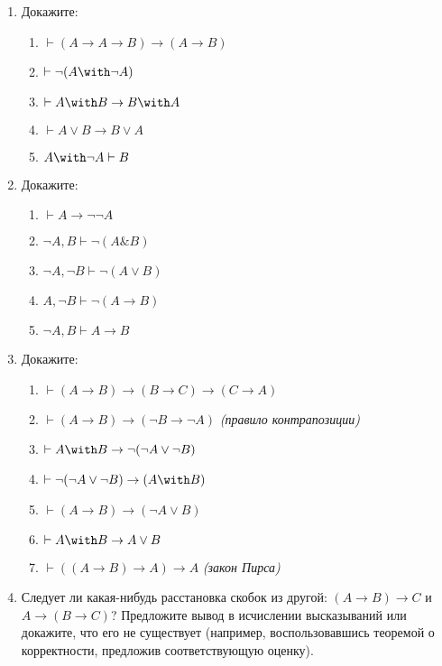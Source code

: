 \documentclass[10pt,a4paper,oneside]{article}
\begin{document}
\begin{enumerate}
\item Докажите:
\begin{enumerate}
\item $\vdash (A \rightarrow A \rightarrow B) \rightarrow (A \rightarrow B)$
\item $\vdash \neg (A \with \neg A)$
\item $\vdash A \with B \rightarrow B \with A$
\item $\vdash A \vee B \rightarrow B \vee A$
\item $A \with \neg A \vdash B$
\end{enumerate}

\item Докажите:
\begin{enumerate}
\item $\vdash A \rightarrow \neg \neg A$
\item $\neg A, B \vdash \neg(A\& B)$
\item $\neg A,\neg B \vdash \neg( A\vee B)$
\item $ A,\neg B \vdash \neg( A\rightarrow B)$
\item $\neg A, B \vdash  A\rightarrow B$
\end{enumerate}

\item Докажите:
\begin{enumerate}
\item $\vdash (A \rightarrow B) \rightarrow (B \rightarrow C) \rightarrow (C \rightarrow A)$ 
\item $\vdash (A \rightarrow B) \rightarrow (\neg B \rightarrow \neg A)$ \emph{(правило контрапозиции)}
\item $\vdash A \with B \rightarrow \neg (\neg A \vee \neg B)$
\item $\vdash \neg (\neg A \vee \neg B) \rightarrow (A \with B)$
\item $\vdash (A \rightarrow B) \rightarrow (\neg A \vee B)$
\item $\vdash A \with B \rightarrow A \vee B$
\item $\vdash ((A \rightarrow B) \rightarrow A)\rightarrow A$ \emph{(закон Пирса)}
\end{enumerate}

\item Следует ли какая-нибудь расстановка скобок из другой: $(A \rightarrow B) \rightarrow C$ и 
$A \rightarrow (B \rightarrow C)$? Предложите вывод в исчислении высказываний или докажите, что его не
существует (например, воспользовавшись теоремой о корректности, предложив соответствующую оценку).


\end{enumerate}
\end{document}
